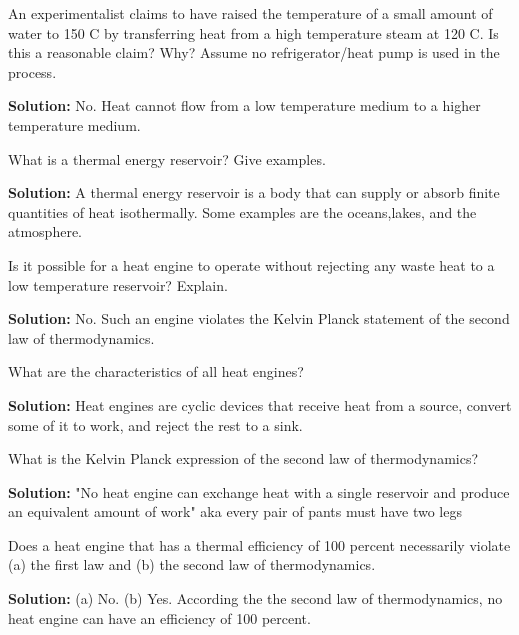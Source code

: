   \begin{list}{\bf Question :~}{}

%
     \item\label{Q1} An experimentalist claims to have raised the temperature of a small amount of water to 150 C by transferring heat from a high temperature steam at 120 C. Is this a reasonable claim? Why? Assume no refrigerator/heat pump is used in the process. 
%

       {\bf Solution:} No. Heat cannot flow from a low temperature medium to a higher temperature medium.

%
     \item\label{Q2} What is a thermal energy reservoir? Give examples.
%

       {\bf Solution:} A thermal energy reservoir is a body that can supply or absorb finite quantities of heat isothermally. Some examples are the oceans,lakes, and the atmosphere.
%
     \item\label{Q3} Is it possible for a heat engine to operate without rejecting any waste heat to a low temperature reservoir? Explain.
%

       {\bf Solution:} No. Such an engine violates the Kelvin Planck statement of the second law of thermodynamics.

%
     \item\label{Q4} What are the characteristics of all heat engines?
%

       {\bf Solution:} Heat engines are cyclic devices that receive heat from a source, convert some of it to work, and reject the rest to a sink.

%
     \item\label{Q5} What is the Kelvin Planck expression of the second law of thermodynamics?
%

       {\bf Solution:} "No heat engine can exchange heat with a single reservoir and produce an equivalent amount of work" aka every pair of pants must have two legs
%
     \item\label{Q6} Does a heat engine that has a thermal efficiency of 100 percent necessarily violate (a) the first law and (b) the second law of thermodynamics.
%

       {\bf Solution:} (a) No. (b) Yes. According the the second law of thermodynamics, no heat engine can have an efficiency of 100 percent.


\end{list}
